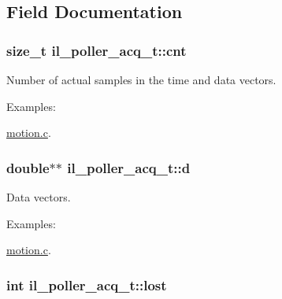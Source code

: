 \subsection{Field Documentation}
\subsubsection[{\texorpdfstring{cnt}{cnt}}]{\setlength{\rightskip}{0pt plus 5cm}size\+\_\+t il\+\_\+poller\+\_\+acq\+\_\+t\+::cnt}\hypertarget{structil__poller__acq__t_aaf726970c22e29aafbbe83d2b24b2eaa}{}\label{structil__poller__acq__t_aaf726970c22e29aafbbe83d2b24b2eaa}


Number of actual samples in the time and data vectors. 

\begin{Desc}
\item[Examples\+: ]\par
\hyperlink{motion_8c-example}{motion.\+c}.\end{Desc}
\subsubsection[{\texorpdfstring{d}{d}}]{\setlength{\rightskip}{0pt plus 5cm}double$\ast$$\ast$ il\+\_\+poller\+\_\+acq\+\_\+t\+::d}\hypertarget{structil__poller__acq__t_aa0c86de89229342ec18f4cf7effdc089}{}\label{structil__poller__acq__t_aa0c86de89229342ec18f4cf7effdc089}


Data vectors. 

\begin{Desc}
\item[Examples\+: ]\par
\hyperlink{motion_8c-example}{motion.\+c}.\end{Desc}
\subsubsection[{\texorpdfstring{lost}{lost}}]{\setlength{\rightskip}{0pt plus 5cm}int il\+\_\+poller\+\_\+acq\+\_\+t\+::lost}\hypertarget{structil__poller__acq__t_a41b46fb77cf99d8d2d307e5ec37f707a}{}\label{structil__poller__acq__t_a41b46fb77cf99d8d2d307e5ec37f707a}


